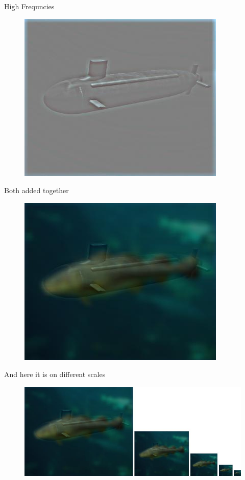 \newpage
High Frequncies
\begin{figure}[h]
\includegraphics{../results/high_frequencies}
\end{figure}

\newpage
Both added together
\begin{figure}[h]
	\includegraphics{../results/hybrid_image}
\end{figure}


\newpage
And here it is on different scales
\begin{figure}[h]
	\includegraphics[scale=0.6]{../results/hybrid_image_scales}
\end{figure}






